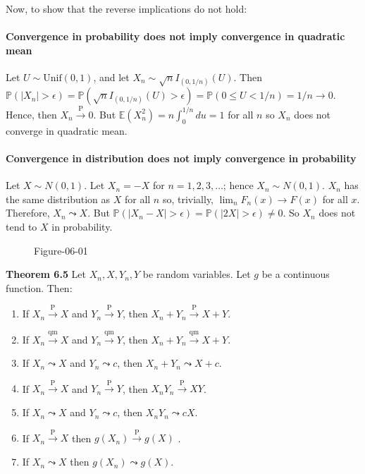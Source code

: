 Now, to show that the reverse implications do not hold:

\paragraph{Convergence in probability does not imply convergence in
quadratic
mean}\label{convergence-in-probability-does-not-imply-convergence-in-quadratic-mean}

Let \(U \sim \text{Unif}(0, 1)\), and let
\(X_n \sim \sqrt{n} I_{(0, 1 / n)}(U)\). Then
\(\mathbb{P}(|X_n| > \epsilon) = \mathbb{P}(\sqrt{n} I_{(0, 1 / n)}(U) > \epsilon) = \mathbb{P}(0 \leq U < 1/n) = 1/n \rightarrow 0\).
Hence, then \(X_n \xrightarrow{\text{P}} 0\). But
\(\mathbb{E}(X_n^2) = n \int_0^{1/n} du = 1\) for all \(n\) so \(X_n\)
does not converge in quadratic mean.

\paragraph{Convergence in distribution does not imply convergence in
probability}\label{convergence-in-distribution-does-not-imply-convergence-in-probability}

Let \(X \sim N(0, 1)\). Let \(X_n = -X\) for \(n = 1, 2, 3, \dots\);
hence \(X_n \sim N(0, 1)\). \(X_n\) has the same distribution as \(X\)
for all \(n\) so, trivially, \(\lim _n F_n(x) \rightarrow F(x)\) for all
\(x\). Therefore, \(X_n \leadsto X\). But
\(\mathbb{P}(|X_n - X| > \epsilon) = \mathbb{P}(|2X| > \epsilon) \neq 0\).
So \(X_n\) does not tend to \(X\) in probability.

\begin{figure}[H]
\centering
{}
\caption{Figure-06-01}
\end{figure}

\textbf{Theorem 6.5} Let \(X_n, X, Y_n, Y\) be random variables. Let
\(g\) be a continuous function. Then:

\begin{enumerate}[tightlist,label={\arabic*.}]
\item
  If \(X_n \xrightarrow{\text{P}} X\) and
  \(Y_n \xrightarrow{\text{P}} Y\), then
  \(X_n + Y_n \xrightarrow{\text{P}} X + Y\).
\item
  If \(X_n \xrightarrow{\text{qm}} X\) and
  \(Y_n \xrightarrow{\text{qm}} Y\), then
  \(X_n + Y_n \xrightarrow{\text{qm}} X + Y\).
\item
  If \(X_n \leadsto X\) and \(Y_n \leadsto c\), then
  \(X_n + Y_n \leadsto X + c\).
\item
  If \(X_n \xrightarrow{\text{P}} X\) and
  \(Y_n \xrightarrow{\text{P}} Y\), then
  \(X_n Y_n \xrightarrow{\text{P}} XY\).
\item
  If \(X_n \leadsto X\) and \(Y_n \leadsto c\), then
  \(X_n Y_n \leadsto cX\).
\item
  If \(X_n \xrightarrow{\text{P}} X\) then
  \(g(X_n) \xrightarrow{\text{P}} g(X)\) .
\item
  If \(X_n \leadsto X\) then \(g(X_n) \leadsto g(X)\).
\end{enumerate}


